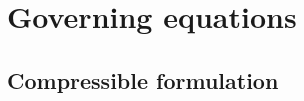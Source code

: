 \chapter{Governing equations}\label{sec:equations}

\def\Re{\mathrm{\bf Re}}
\def\Pr{\mathrm{\bf Pr}}
\def\Sc{\mathrm{\bf Sc}}
\def\Le{\mathrm{\bf Le}}
\def\Fr{\mathrm{\bf Fr}}
\def\Ro{\mathrm{\bf Ro}}
\def\Ma{\mathrm{\bf Ma}}
\def\Da{\mathrm{\bf Da}}

\section{Compressible formulation}


